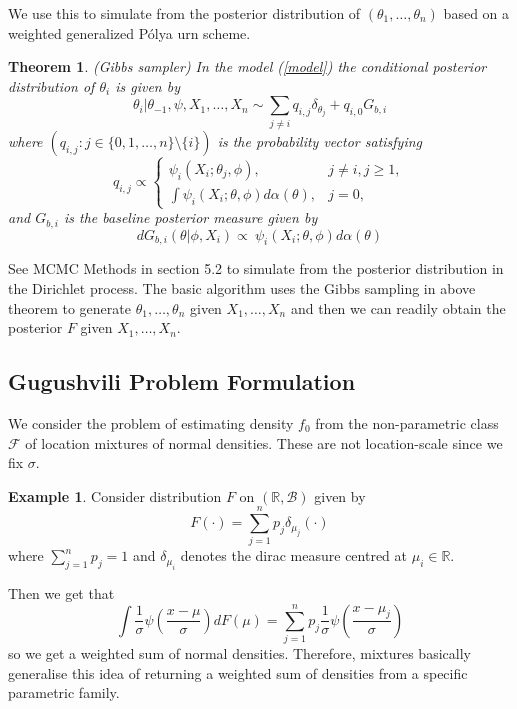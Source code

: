 \documentclass[a4paper,11pt]{article}
\theoremstyle{theorem}
\newtheorem{thm}{Theorem}
\theoremstyle{definition}
\newtheorem*{eg}{Example}
\theoremstyle{remark}
\begin{document}
We use this to simulate from the posterior distribution of $(\theta_1, \dotsc, \theta_n)$ based on a weighted generalized P\'{o}lya urn scheme.

\begin{thm}
(Gibbs sampler) In the model (\ref{model}) the conditional posterior distribution of $\theta_i$ is given by
\begin{equation}
\theta_i | \theta_{-1}, \psi, X_1, \dotsc, X_n \sim \sum_{j \neq i}{q_{i,j} \delta_{\theta_j} + q_{i,0}G_{b,i}} 
\end{equation}
where $(q_{i,j}:j \in \{0,1, \dotsc, n\} \setminus \{i\})$ is the probability vector satisfying
\[
q_{i,j} \propto 
\begin{cases}
\psi_{i}(X_i;\theta_j, \phi), & j \neq i, j \geq 1, \\
\int{\psi_{i}(X_i; \theta, \phi)d\alpha(\theta)}, & j = 0,
\end{cases}
\]
and $G_{b,i}$ is the baseline posterior measure given by
\[
dG_{b,i}(\theta | \phi, X_i) \propto \ \psi_{i}(X_i; \theta, \phi)d\alpha(\theta)
\]
\end{thm}

See MCMC Methods in section 5.2 to simulate from the posterior distribution in the Dirichlet process. The basic algorithm uses the Gibbs sampling in above theorem to generate $\theta_1, \dotsc, \theta_n$ given $X_1, \dotsc, X_n$ and then we can readily obtain the posterior $F$ given $X_1, \dotsc, X_n$.

\subsection{Gugushvili Problem Formulation}

We consider the problem of estimating density $f_{0}$ from the non-parametric class $\mathcal{F}$ of location mixtures of normal densities. These are not location-scale since we fix $\sigma$.

\begin{eg}
Consider distribution $F$ on $(\mathbb{R}, \mathcal{B})$ given by
\[
F(\cdot) = \sum_{j=1}^{n}{p_j\delta_{\mu_j}(\cdot)}
\]  
where $\sum_{j=1}^{n}{p_j} = 1$ and $\delta_{\mu_i}$ denotes the dirac measure centred at $\mu_i \in \mathbb{R}$.

Then we get that
\[
\int{\frac{1}{\sigma}\psi\left(\frac{x- \mu}{\sigma}\right)dF(\mu)} = \sum_{j=1}^{n}{p_j\frac{1}{\sigma}\psi\left(\frac{x- \mu_j}{\sigma}\right)}
\]
so we get a weighted sum of normal densities. Therefore, mixtures basically generalise this idea of returning a weighted sum of densities from a specific parametric family.
\end{eg}
\end{document}
